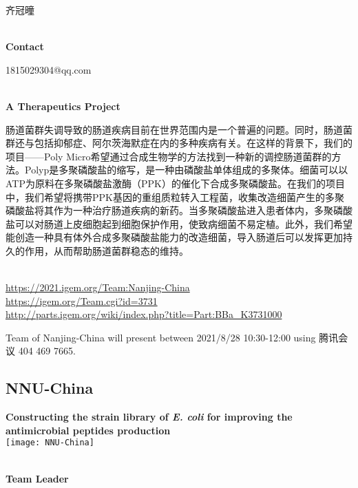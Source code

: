   齐冠曈


\textbf{\\Contact}

  1815029304@qq.com


\textbf{\\A Therapeutics Project\\}\begin{spacing}{1.5}

肠道菌群失调导致的肠道疾病目前在世界范围内是一个普遍的问题。同时，肠道菌群还与包括抑郁症、阿尔茨海默症在内的多种疾病有关。在这样的背景下，我们的项目——Poly Micro希望通过合成生物学的方法找到一种新的调控肠道菌群的方法。Polyp是多聚磷酸盐的缩写，是一种由磷酸盐单体组成的多聚体。细菌可以以ATP为原料在多聚磷酸盐激酶（PPK）的催化下合成多聚磷酸盐。在我们的项目中，我们希望将携带PPK基因的重组质粒转入工程菌，收集改造细菌产生的多聚磷酸盐将其作为一种治疗肠道疾病的新药。当多聚磷酸盐进入患者体内，多聚磷酸盐可以对肠道上皮细胞起到细胞保护作用，使致病细菌不易定植。此外，我们希望能创造一种具有体外合成多聚磷酸盐能力的改造细菌，导入肠道后可以发挥更加持久的作用，从而帮助肠道菌群稳态的维持。\end{spacing}
\\

\url{https://2021.igem.org/Team:Nanjing-China }\\
\url{https://igem.org/Team.cgi?id=3731 }\\
\url{http://parts.igem.org/wiki/index.php?title=Part:BBa_K3731000 }\\


\vfill{}









Team of Nanjing-China will present between     2021/8/28 10:30-12:00    using 腾讯会议 404 469 7665.
\newpage


\subsection{\textcolor{Blu}{ NNU-China } }
\vspace{5mm}
\begin{center}
\large{
  \textbf{ Constructing the strain library of \textit{E. coli} for improving the antimicrobial peptides production }\\

  \texttt{[image: NNU-China]}
}
\end{center}
\textbf{\\Team Leader}

